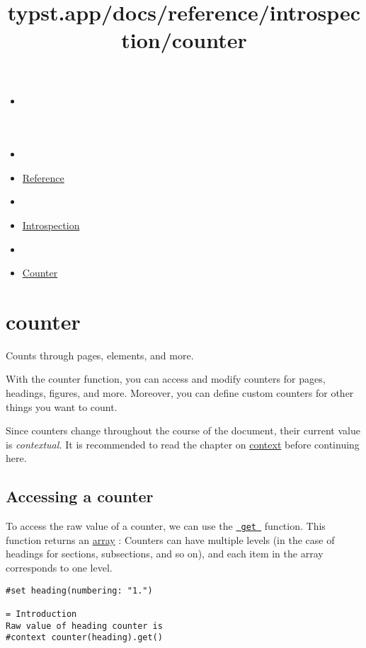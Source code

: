 \title{typst.app/docs/reference/introspection/counter}

\begin{itemize}
\tightlist
\item
  \href{/docs}{}
\item
  
\item
  \href{/docs/reference/}{Reference}
\item
  
\item
  \href{/docs/reference/introspection/}{Introspection}
\item
  
\item
  \href{/docs/reference/introspection/counter/}{Counter}
\end{itemize}

\section{\texorpdfstring{{ counter }}{ counter }}\label{summary}

Counts through pages, elements, and more.

With the counter function, you can access and modify counters for pages,
headings, figures, and more. Moreover, you can define custom counters
for other things you want to count.

Since counters change throughout the course of the document, their
current value is \emph{contextual.} It is recommended to read the
chapter on \href{/docs/reference/context/}{context} before continuing
here.

\subsection{Accessing a counter}\label{accessing}

To access the raw value of a counter, we can use the
\href{/docs/reference/introspection/counter/\#definitions-get}{\texttt{\ get\ }}
function. This function returns an
\href{/docs/reference/foundations/array/}{array} : Counters can have
multiple levels (in the case of headings for sections, subsections, and
so on), and each item in the array corresponds to one level.

\begin{verbatim}
#set heading(numbering: "1.")

= Introduction
Raw value of heading counter is
#context counter(heading).get()
\end{verbatim}

